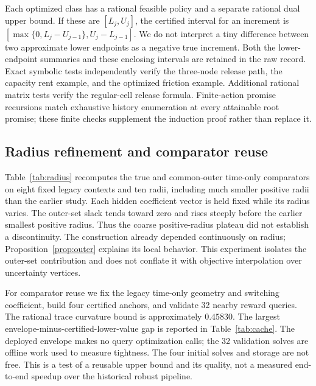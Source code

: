 \documentclass[11pt,letterpaper]{article}
\theoremstyle{definition}\newtheorem{assumption}[theorem]{Assumption}
\begin{document}
Each optimized class has a rational feasible policy and a separate rational dual upper bound. If these are $[L_j,U_j]$, the certified interval for an increment is
$[\max\{0,L_j-U_{j-1}\},U_j-L_{j-1}]$. We do not interpret a tiny difference between two approximate lower endpoints as a negative true increment. Both the lower-endpoint summaries and these enclosing intervals are retained in the raw record. Exact symbolic tests independently verify the three-node release path, the capacity rent example, and the optimized friction example. Additional rational matrix tests verify the regular-cell release formula. Finite-action promise recursions match exhaustive history enumeration at every attainable root promise; these finite checks supplement the induction proof rather than replace it.

\subsection{Radius refinement and comparator reuse}
Table~\ref{tab:radius} recomputes the true and common-outer time-only comparators on eight fixed legacy contexts and ten radii, including much smaller positive radii than the earlier study. Each hidden coefficient vector is held fixed while its radius varies. The outer-set slack tends toward zero and rises steeply before the earlier smallest positive radius. Thus the coarse positive-radius plateau did not establish a discontinuity. The construction already depended continuously on radius; Proposition~\ref{prop:outer} explains its local behavior. This experiment isolates the outer-set contribution and does not conflate it with objective interpolation over uncertainty vertices.


For comparator reuse we fix the legacy time-only geometry and switching coefficient, build four certified anchors, and validate 32 nearby reward queries. The rational trace curvature bound is approximately $0.45830$. The largest envelope-minus-certified-lower-value gap is reported in Table~\ref{tab:cache}. The deployed envelope makes no query optimization calls; the 32 validation solves are offline work used to measure tightness. The four initial solves and storage are not free. This is a test of a reusable upper bound and its quality, not a measured end-to-end speedup over the historical robust pipeline.

\end{document}

